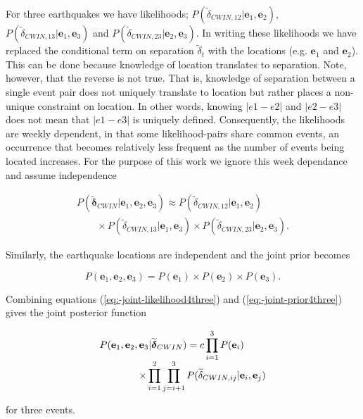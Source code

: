 \documentclass[12pt,double]{article}
\newcommand{\mitbf}[1]{  
  \hbox{\mathversion{bold}$#1$}}
\begin{document}
For three earthquakes we have likelihoods;
$P(\widetilde{\delta}_{CWIN,12}|\mathbf{e}_1, \mathbf{e}_2)$,
$P(\widetilde{\delta}_{CWIN,13}|\mathbf{e}_1, \mathbf{e}_3)$
and
$P(\widetilde{\delta}_{CWIN,23}|\mathbf{e}_2, \mathbf{e}_3)$.
In writing
these likelihoods we have replaced the conditional term on separation
$\widetilde{\delta}_t$ with the locations (e.g. $\mathbf{e}_1$ and $\mathbf{e}_2$).
This can be done because
knowledge of location translates to separation. Note, however, that the reverse is
not true. That is, knowledge of separation between a single event pair
does not uniquely translate to location but rather places a non-unique constraint on
location. In other words, knowing $|e1-e2|$ and $|e2-e3|$ does not mean that $|e1-e3|$ is 
uniquely defined. Consequently, the likelihoods are weekly dependent, in that some 
likelihood-pairs share common events, an occurrence that becomes relatively less frequent 
as the number of events being located increases. 
For the purpose of this work we ignore this week dependance 
and assume independence
\begin{linenomath*} \begin{equation}
\begin{array}{l}
\label{eq:-joint-likelihood4three}
P(\widetilde{\mathbf{\delta}}_{CWIN} | \mathbf{e}_1, \mathbf{e}_2, \mathbf{e}_3) \approx
P(\widetilde{\delta}_{CWIN,12} | \mathbf{e}_1, \mathbf{e}_2) \\
\hspace{2em} \times P(\widetilde{\delta}_{CWIN,13} | \mathbf{e}_1, \mathbf{e}_3)
\times  P(\widetilde{\delta}_{CWIN,23} | \mathbf{e}_2, \mathbf{e}_3).
\end{array}
\end{equation} \end{linenomath*}
Similarly, the earthquake locations are independent and the
joint prior becomes
\begin{linenomath*} \begin{equation}
\label{eq:-joint-prior4three} P(\mathbf{e}_1, \mathbf{e}_2,
\mathbf{e}_3) = P(\mathbf{e}_1) \times P(\mathbf{e}_2) \times
P(\mathbf{e}_3).
\end{equation} \end{linenomath*}
Combining equations (\ref{eq:-joint-likelihood4three}) and
(\ref{eq:-joint-prior4three}) gives the joint posterior function
\begin{linenomath*} \begin{equation}
\label{eq-3eqposterior}
\begin{array}{l}
P(\mathbf{e}_1, \mathbf{e}_2, \mathbf{e}_3 | \widetilde{\mitbf{\delta}}_{CWIN}) = c \displaystyle \prod_{i=1}^3 P(\mathbf{e}_i) \\
\hspace{4em}  \times \displaystyle \prod_{i=1}^2 \prod_{j=i+1}^3
P(\widetilde{\delta}_{CWIN,ij}|\mathbf{e}_i,\mathbf{e}_j)
\end{array}
\end{equation} \end{linenomath*}
for three events.
\end{document}
